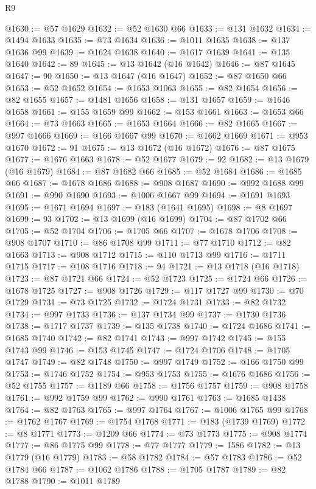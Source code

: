 \begin{lexlean}{R9}
\begin{coremodule}
@1630 := @57 @1629
@1632 := @52 @1630 @66
@1633 := @131 @1632
@1634 := @1494 @1633
@1635 := @73 @1634
@1636 := @1011 @1635
@1638 := @137 @1636 @99
@1639 := @1624 @1638
@1640 := @1617 @1639
@1641 := @135 @1640
@1642 := 89
@1645 := @13 @1642 (@16 @1642)
@1646 := @87 @1645
@1647 := 90
@1650 := @13 @1647 (@16 @1647)
@1652 := @87 @1650 @66
@1653 := @52 @1652
@1654 := @1653 @1063
@1655 := @82 @1654
@1656 := @82 @1655
@1657 := @1481 @1656
@1658 := @131 @1657
@1659 := @1646 @1658
@1661 := @155 @1659 @99
@1662 := @153 @1661
@1663 := @1653 @66
@1664 := @73 @1663
@1665 := @1653 @1664
@1666 := @82 @1665
@1667 := @997 @1666
@1669 := @166 @1667 @99
@1670 := @1662 @1669
@1671 := @953 @1670
@1672 := 91
@1675 := @13 @1672 (@16 @1672)
@1676 := @87 @1675
@1677 := @1676 @1663
@1678 := @52 @1677
@1679 := 92
@1682 := @13 @1679 (@16 @1679)
@1684 := @87 @1682 @66
@1685 := @52 @1684
@1686 := @1685 @66
@1687 := @1678 @1686
@1688 := @908 @1687
@1690 := @992 @1688 @99
@1691 := @990 @1690
@1693 := @1006 @1667 @99
@1694 := @1691 @1693
@1695 := @1671 @1694
@1697 := @183 (@1641 @1695)
@1698 := @8 @1697
@1699 := 93
@1702 := @13 @1699 (@16 @1699)
@1704 := @87 @1702 @66
@1705 := @52 @1704
@1706 := @1705 @66
@1707 := @1678 @1706
@1708 := @908 @1707
@1710 := @86 @1708 @99
@1711 := @77 @1710
@1712 := @82 @1663
@1713 := @908 @1712
@1715 := @110 @1713 @99
@1716 := @1711 @1715
@1717 := @108 @1716
@1718 := 94
@1721 := @13 @1718 (@16 @1718)
@1723 := @87 @1721 @66
@1724 := @52 @1723
@1725 := @1724 @66
@1726 := @1678 @1725
@1727 := @908 @1726
@1729 := @117 @1727 @99
@1730 := @70 @1729
@1731 := @73 @1725
@1732 := @1724 @1731
@1733 := @82 @1732
@1734 := @997 @1733
@1736 := @137 @1734 @99
@1737 := @1730 @1736
@1738 := @1717 @1737
@1739 := @135 @1738
@1740 := @1724 @1686
@1741 := @1685 @1740
@1742 := @82 @1741
@1743 := @997 @1742
@1745 := @155 @1743 @99
@1746 := @153 @1745
@1747 := @1724 @1706
@1748 := @1705 @1747
@1749 := @82 @1748
@1750 := @997 @1749
@1752 := @166 @1750 @99
@1753 := @1746 @1752
@1754 := @953 @1753
@1755 := @1676 @1686
@1756 := @52 @1755
@1757 := @1189 @66
@1758 := @1756 @1757
@1759 := @908 @1758
@1761 := @992 @1759 @99
@1762 := @990 @1761
@1763 := @1685 @1438
@1764 := @82 @1763
@1765 := @997 @1764
@1767 := @1006 @1765 @99
@1768 := @1762 @1767
@1769 := @1754 @1768
@1771 := @183 (@1739 @1769)
@1772 := @8 @1771
@1773 := @1209 @66
@1774 := @73 @1773
@1775 := @908 @1774
@1777 := @86 @1775 @99
@1778 := @77 @1777
@1779 := 1586
@1782 := @13 @1779 (@16 @1779)
@1783 := @58 @1782
@1784 := @57 @1783
@1786 := @52 @1784 @66
@1787 := @1062 @1786
@1788 := @1705 @1787
@1789 := @82 @1788
@1790 := @1011 @1789

\end{coremodule}
\end{lexlean}
